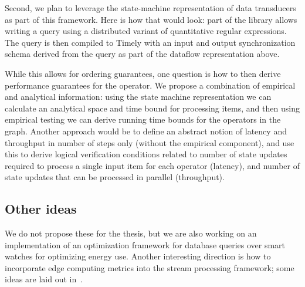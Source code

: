 Second, we plan to leverage the state-machine representation of data transducers as part of this framework.
Here is how that would look: part of the library allows writing
a query using a distributed variant of quantitative regular expressions.
The query is then compiled to Timely with an input and output synchronization schema derived from the query as part of the dataflow representation above.

While this allows for ordering guarantees, one question is how to then derive performance guarantees for the operator.
We propose a combination of empirical and analytical information: using the state machine representation we can calculate an analytical space and time bound for processing items,
and then using empirical testing we can derive running time bounds for the operators in the graph.
Another approach would be to define an abstract notion of latency and throughput in number of steps only (without the empirical component),
and use this to derive logical verification conditions related to number of state updates required to process a single input item for each operator (latency),
and number of state updates that can be processed in parallel (throughput).

\subsection{Other ideas}

We do not propose these for the thesis,
but we are also working on an implementation of an optimization framework
for database queries over smart watches for optimizing energy use.
Another interesting direction is how to incorporate edge computing metrics into the stream processing framework; some ideas are laid out in~.

